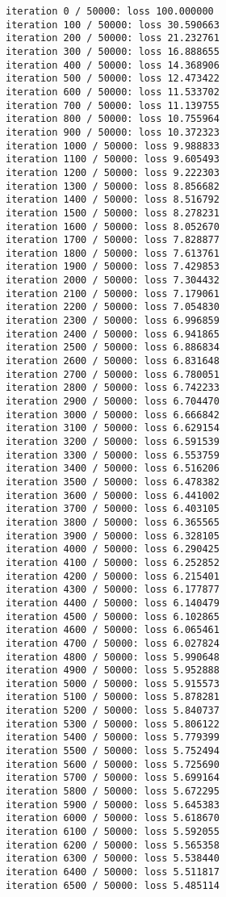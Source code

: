 \documentclass[11pt]{article}
\begin{document}
    \begin{Verbatim}[commandchars=\\\{\}]
iteration 0 / 50000: loss 100.000000
iteration 100 / 50000: loss 30.590663
iteration 200 / 50000: loss 21.232761
iteration 300 / 50000: loss 16.888655
iteration 400 / 50000: loss 14.368906
iteration 500 / 50000: loss 12.473422
iteration 600 / 50000: loss 11.533702
iteration 700 / 50000: loss 11.139755
iteration 800 / 50000: loss 10.755964
iteration 900 / 50000: loss 10.372323
iteration 1000 / 50000: loss 9.988833
iteration 1100 / 50000: loss 9.605493
iteration 1200 / 50000: loss 9.222303
iteration 1300 / 50000: loss 8.856682
iteration 1400 / 50000: loss 8.516792
iteration 1500 / 50000: loss 8.278231
iteration 1600 / 50000: loss 8.052670
iteration 1700 / 50000: loss 7.828877
iteration 1800 / 50000: loss 7.613761
iteration 1900 / 50000: loss 7.429853
iteration 2000 / 50000: loss 7.304432
iteration 2100 / 50000: loss 7.179061
iteration 2200 / 50000: loss 7.054830
iteration 2300 / 50000: loss 6.996859
iteration 2400 / 50000: loss 6.941865
iteration 2500 / 50000: loss 6.886834
iteration 2600 / 50000: loss 6.831648
iteration 2700 / 50000: loss 6.780051
iteration 2800 / 50000: loss 6.742233
iteration 2900 / 50000: loss 6.704470
iteration 3000 / 50000: loss 6.666842
iteration 3100 / 50000: loss 6.629154
iteration 3200 / 50000: loss 6.591539
iteration 3300 / 50000: loss 6.553759
iteration 3400 / 50000: loss 6.516206
iteration 3500 / 50000: loss 6.478382
iteration 3600 / 50000: loss 6.441002
iteration 3700 / 50000: loss 6.403105
iteration 3800 / 50000: loss 6.365565
iteration 3900 / 50000: loss 6.328105
iteration 4000 / 50000: loss 6.290425
iteration 4100 / 50000: loss 6.252852
iteration 4200 / 50000: loss 6.215401
iteration 4300 / 50000: loss 6.177877
iteration 4400 / 50000: loss 6.140479
iteration 4500 / 50000: loss 6.102865
iteration 4600 / 50000: loss 6.065461
iteration 4700 / 50000: loss 6.027824
iteration 4800 / 50000: loss 5.990648
iteration 4900 / 50000: loss 5.952888
iteration 5000 / 50000: loss 5.915573
iteration 5100 / 50000: loss 5.878281
iteration 5200 / 50000: loss 5.840737
iteration 5300 / 50000: loss 5.806122
iteration 5400 / 50000: loss 5.779399
iteration 5500 / 50000: loss 5.752494
iteration 5600 / 50000: loss 5.725690
iteration 5700 / 50000: loss 5.699164
iteration 5800 / 50000: loss 5.672295
iteration 5900 / 50000: loss 5.645383
iteration 6000 / 50000: loss 5.618670
iteration 6100 / 50000: loss 5.592055
iteration 6200 / 50000: loss 5.565358
iteration 6300 / 50000: loss 5.538440
iteration 6400 / 50000: loss 5.511817
iteration 6500 / 50000: loss 5.485114

\end{Verbatim}
\end{document}
